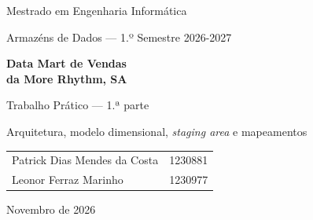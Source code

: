 \documentclass[a4paper,11pt]{article}
\newcommand{\NomeA}{Patrick Dias Mendes da Costa}
\newcommand{\NumA}{1230881}
\newcommand{\NomeB}{Leonor Ferraz Marinho}
\newcommand{\NumB}{1230977}
\newcommand{\DataEntrega}{Novembro de 2026}
\begin{document}
\begin{titlepage}
  \centering
  {\large Mestrado em Engenharia Informática\par}
  {\large Armazéns de Dados --- 1.º Semestre 2026-2027\par}
  \vspace*{3.2cm}
  {\Huge\bfseries\color{azul} Data Mart de Vendas\\[4pt] da More Rhythm, SA\par}
  \vspace{1cm}
  {\Large Trabalho Prático --- 1.ª parte\par}
  \vspace{4pt}
  {\large Arquitetura, modelo dimensional, \emph{staging area} e mapeamentos\par}
  \vfill
  \begin{tabular}{ll}
    \NomeA & \NumA \\
    \NomeB & \NumB \\
  \end{tabular}
  \vspace{1cm}

  {\large \DataEntrega\par}
\end{titlepage}

\tableofcontents
\clearpage
{}


\end{document}
